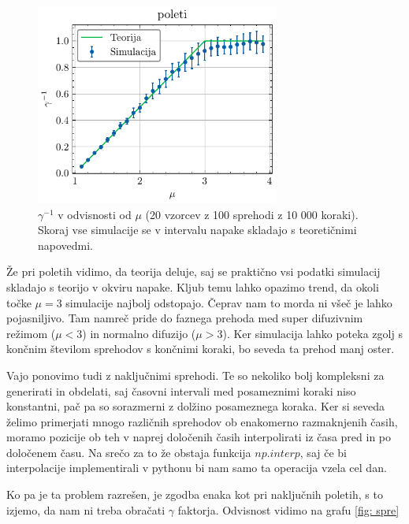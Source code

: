 \documentclass[slovene,11pt,a4paper]{article}
\begin{document}
\begin{figure}[ht]
\begin{center}
  \includegraphics[width=8cm]{graphs/poleti.pdf}
  \caption{$\gamma^{-1}$ v odvisnosti od $\mu$ (20 vzorcev z 100 sprehodi z 10 000 koraki). Skoraj vse simulacije se v intervalu napake skladajo s teoretičnimi napovedmi.}
  \label{fig: poleti}
\end{center}
\end{figure}
\bigskip
Že pri poletih vidimo, da teorija deluje, saj se praktično vsi podatki simulacij skladajo s teorijo v okviru napake. Kljub temu lahko opazimo trend, da okoli točke $\mu = 3$ simulacije najbolj odstopajo. Čeprav nam to morda ni všeč je lahko pojasniljivo. Tam namreč pride do faznega prehoda med super difuzivnim režimom ($\mu < 3$) in normalno difuzijo ($\mu > 3$). Ker simulacija lahko poteka zgolj s končnim številom sprehodov s končnimi koraki, bo seveda ta prehod manj oster.

\bigskip
Vajo ponovimo tudi z naključnimi sprehodi. Te so nekoliko bolj kompleksni za generirati in obdelati, saj časovni intervali med posameznimi koraki niso konstantni, pač pa so sorazmerni z dolžino posameznega koraka. Ker si seveda želimo primerjati mnogo različnih sprehodov ob enakomerno razmaknjenih časih, moramo pozicije ob teh v naprej določenih časih interpolirati iz časa pred in po določenem času. Na srečo za to že obstaja funkcija $np.interp$, saj če bi interpolacije implementirali v pythonu bi nam samo ta operacija vzela cel dan.

Ko pa je ta problem razrešen, je zgodba enaka kot pri naključnih poletih, s to izjemo, da nam ni treba obračati $\gamma$ faktorja. Odvisnost vidimo na grafu \ref{fig: spre}
\end{document}
